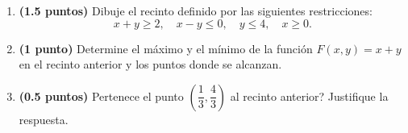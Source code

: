 
\begin{enumerate}[label=\alph*)]
\item \textbf{(1.5 puntos)} Dibuje el recinto definido por las siguientes restricciones:
\[
x+y\geq2,\quad x-y\leq0,\quad y\leq4,\quad x\geq0.
\]
\item \textbf{(1 punto)} Determine el máximo y el mínimo de la función $F(x,y)=x+y$ en el recinto anterior y los puntos donde se alcanzan.
\item \textbf{(0.5 puntos)} \textquestiondown{}Pertenece el punto $\left(\dfrac{1}{3},\dfrac{4}{3}\right)$ al recinto anterior? Justifique la respuesta.
\end{enumerate}
